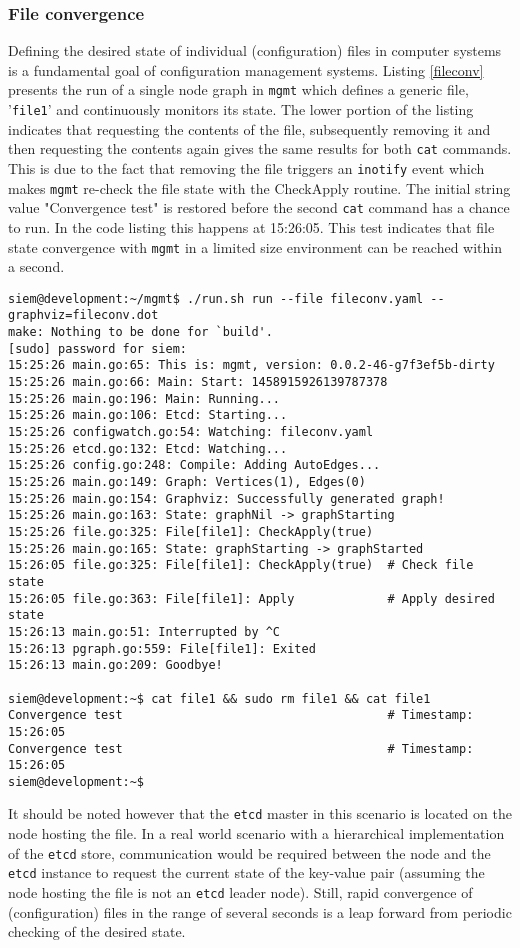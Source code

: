 \subsubsection{File convergence}
Defining the desired state of individual (configuration) files in computer systems is a fundamental goal of configuration management systems. Listing \ref{fileconv} presents the run of a single node graph in \texttt{mgmt} which defines a generic file, '\texttt{file1}' and continuously monitors its state. The lower portion of the listing indicates that requesting the contents of the file, subsequently removing it and then requesting the contents again gives the same results for both \texttt{cat} commands. This is due to the fact that removing the file triggers an \texttt{inotify} event which makes \texttt{mgmt} re-check the file state with the CheckApply routine. The initial string value "Convergence test" is restored before the second \texttt{cat} command has a chance to run. In the code listing this happens at 15:26:05. This test indicates that file state convergence with \texttt{mgmt} in a limited size environment can be reached within a second.
\\
\begin{lstlisting}[caption={Rapid file convergence in \texttt{mgmt}},label=fileconv]
siem@development:~/mgmt$ ./run.sh run --file fileconv.yaml --graphviz=fileconv.dot
make: Nothing to be done for `build'.
[sudo] password for siem: 
15:25:26 main.go:65: This is: mgmt, version: 0.0.2-46-g7f3ef5b-dirty
15:25:26 main.go:66: Main: Start: 1458915926139787378
15:25:26 main.go:196: Main: Running...
15:25:26 main.go:106: Etcd: Starting...
15:25:26 configwatch.go:54: Watching: fileconv.yaml
15:25:26 etcd.go:132: Etcd: Watching...
15:25:26 config.go:248: Compile: Adding AutoEdges...
15:25:26 main.go:149: Graph: Vertices(1), Edges(0)
15:25:26 main.go:154: Graphviz: Successfully generated graph!
15:25:26 main.go:163: State: graphNil -> graphStarting
15:25:26 file.go:325: File[file1]: CheckApply(true)
15:25:26 main.go:165: State: graphStarting -> graphStarted
15:26:05 file.go:325: File[file1]: CheckApply(true)  # Check file state
15:26:05 file.go:363: File[file1]: Apply             # Apply desired state 
15:26:13 main.go:51: Interrupted by ^C
15:26:13 pgraph.go:559: File[file1]: Exited
15:26:13 main.go:209: Goodbye!

siem@development:~$ cat file1 && sudo rm file1 && cat file1 
Convergence test                                     # Timestamp: 15:26:05
Convergence test                                     # Timestamp: 15:26:05
siem@development:~$ 
\end{lstlisting}
\noindent
It should be noted however that the \texttt{etcd} master in this scenario is located on the node hosting the file. In a real world scenario with a hierarchical implementation of the \texttt{etcd} store, communication would be required between the node and the \texttt{etcd} instance to request the current state of the key-value pair (assuming the node hosting the file is not an \texttt{etcd} leader node). Still, rapid convergence of (configuration) files in the range of several seconds is a leap forward from periodic checking of the desired state.

